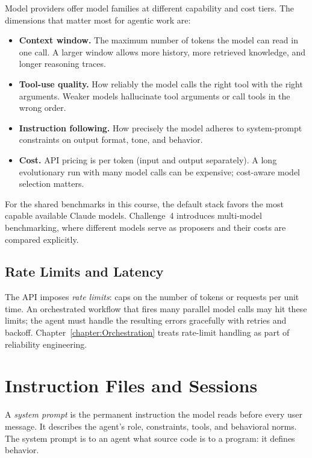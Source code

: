 Model providers offer model families at different capability and cost tiers.
The dimensions that matter most for agentic work are:
\begin{itemize}
\item \textbf{Context window.} The maximum number of tokens the model can read in one call.
A larger window allows more history, more retrieved knowledge, and longer reasoning traces.
\item \textbf{Tool-use quality.} How reliably the model calls the right tool with the right arguments.
Weaker models hallucinate tool arguments or call tools in the wrong order.
\item \textbf{Instruction following.} How precisely the model adheres to system-prompt constraints on output format, tone, and behavior.
\item \textbf{Cost.} API pricing is per token (input and output separately).
A long evolutionary run with many model calls can be expensive; cost-aware model selection matters.
\end{itemize}

For the shared benchmarks in this course, the default stack favors the most capable available Claude models.
Challenge~4 introduces multi-model benchmarking, where different models serve as proposers and their costs are compared explicitly.

\subsection{Rate Limits and Latency}

The API imposes \emph{rate limits}: caps on the number of tokens or requests per unit time.
An orchestrated workflow that fires many parallel model calls may hit these limits; the agent must handle the resulting errors gracefully with retries and backoff.
Chapter~\ref{chapter:Orchestration} treats rate-limit handling as part of reliability engineering.

\section{Instruction Files and Sessions}
\label{section:InstructionFiles}

A \emph{system prompt} is the permanent instruction the model reads before every user message.
It describes the agent's role, constraints, tools, and behavioral norms.
The system prompt is to an agent what source code is to a program: it defines behavior.


